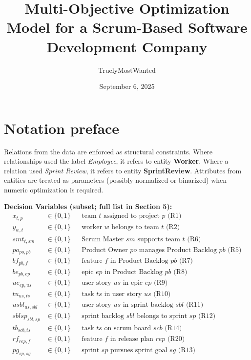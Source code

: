 \documentclass[11pt]{article}
\title{Multi-Objective Optimization Model for a Scrum-Based Software Development Company}
\author{TruelyMostWanted}
\date{September 6, 2025}
\begin{document}
\maketitle
\tableofcontents
\newpage

\section*{Notation preface}
Relations from the data are enforced as structural constraints. Where relationships used the label \emph{Employee}, it refers to entity \textbf{Worker}. Where a relation used \emph{Sprint Review}, it refers to entity \textbf{SprintReview}. Attributes from entities are treated as parameters (possibly normalized or binarized) when numeric optimization is required.

\vspace{6pt}
\noindent\textbf{Decision Variables (subset; full list in Section 5):}
\begin{align*}
x_{t,p} &\in \{0,1\} && \text{team $t$ assigned to project $p$ (R1)}\\
y_{w,t} &\in \{0,1\} && \text{worker $w$ belongs to team $t$ (R2)}\\
smt_{t,sm} &\in \{0,1\} && \text{Scrum Master $sm$ supports team $t$ (R6)}\\
po_{po,pb} &\in \{0,1\} && \text{Product Owner $po$ manages Product Backlog $pb$ (R5)}\\
bf_{pb,f} &\in \{0,1\} && \text{feature $f$ in Product Backlog $pb$ (R7)}\\
be_{pb,ep} &\in \{0,1\} && \text{epic $ep$ in Product Backlog $pb$ (R8)}\\
ue_{ep,us} &\in \{0,1\} && \text{user story $us$ in epic $ep$ (R9)}\\
tu_{us,ts} &\in \{0,1\} && \text{task $ts$ in user story $us$ (R10)}\\
usbl_{us,sbl} &\in \{0,1\} && \text{user story $us$ in sprint backlog $sbl$ (R11)}\\
sblsp_{sbl,sp} &\in \{0,1\} && \text{sprint backlog $sbl$ belongs to sprint $sp$ (R12)}\\
tb_{scb,ts} &\in \{0,1\} && \text{task $ts$ on scrum board $scb$ (R14)}\\
rf_{rep,f} &\in \{0,1\} && \text{feature $f$ in release plan $rep$ (R20)}\\
pg_{sp,sg} &\in \{0,1\} && \text{sprint $sp$ pursues sprint goal $sg$ (R13)}
\end{align*}
\end{document}

